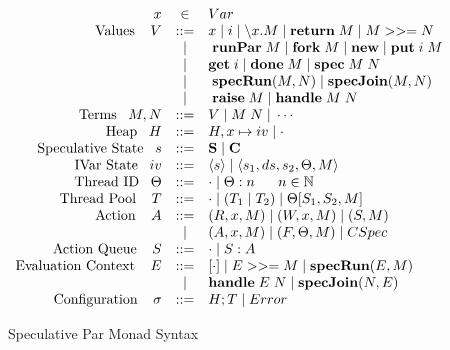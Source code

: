 \begin{figure}
\begingroup
\begin{displaymath}
\begin{array}{rcll}

x &\in& Var \\

\text{Values} \;\;\;\; V & ::= & x \; | \; i \; | \; \backslash x. M  \; | \; \return \; M \; | \; M >>= N \\
 &|& \; \runPar \; M \; | \; \fork \; M \; | \; \new \; | \; \putKW \; i \; M \\
& | & \getKW \; i \; | \;  \doneKW \; M \; | \; \specKW \; M \; N \\
 &|& \; \specRunKW(M, N) \; | \; \specJoinKW(M, N) \\
  &|& \; \raiseKW \; M \; | \; \handleKW \; M \; N  \\

\text{Terms} \;\;\; M, N &::=&  V \;| \;M \; N \; | \; \cdots\\

\text{Heap} \;\;\; H &::=& H, x \mapsto iv \; | \; \cdot \\

\text{Speculative State} \;\;\; s &::=& \spec \; | \; \commit \\

\text{IVar State} \;\;\; iv &::=& \langle s \rangle \; | \; \langle s_1, ds, s_2, \Theta, M\rangle \\

\text{Thread ID} \;\;\; \Theta &::=& \cdot \; | \; \Theta : n \;\;\;\;\;\; n \in \mathbb{N}\\

\text{Thread Pool} \;\;\;\; T &::=& \cdot \; | \; (T_1 \; | \; T_2) \; | \; \Theta[S_1, S_2, M] \\

\text{Action} \;\;\;\; A &::=& (R, x, M) \; | \; (W, x, M) \; | \; (S, M) \\
&|& (A, x, M) \; | \; (F, \Theta, M) \; | \; CSpec \\

\text{Action Queue} \;\;\;\; S &::=& \cdot \; | \; S : A\; \\

\text{Evaluation Context} \;\;\;\; E &::=& [\cdot] \; | \; E >>= M \; | \; \specRunKW(E, M) \\
&|&  \handleKW \; E \; N \; | \; \specJoinKW(N, E) \\

\text{Configuration} \;\;\;\; \sigma &::=& H; T \; | \; Error \\
\end{array}
\end{displaymath}
\endgroup

\caption{Speculative Par Monad Syntax}
\label{fig:syntax}
\end{figure}

